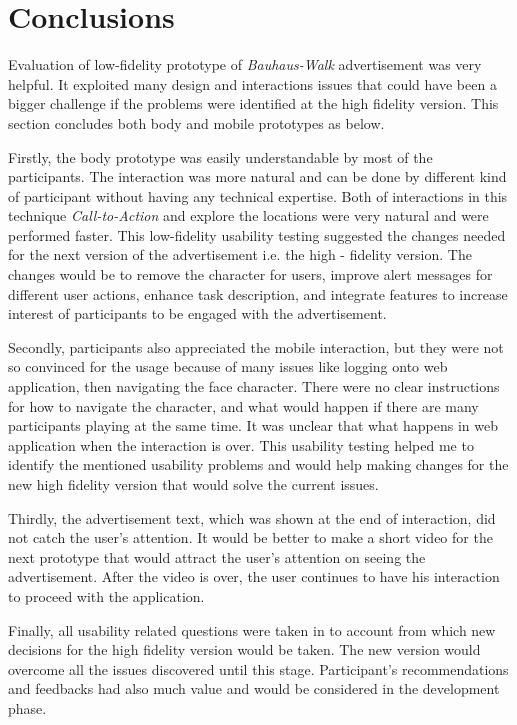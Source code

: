 \section{Conclusions}

Evaluation of low-fidelity prototype of \emph{Bauhaus-Walk} advertisement was very helpful. It exploited many design and interactions issues that could have been a bigger challenge if the problems were identified at the high fidelity version. This section concludes both body and mobile prototypes as below.

Firstly, the body prototype was easily understandable by most of the participants. The interaction was more natural and can be done by different kind of participant without having any technical expertise. Both of interactions in this technique \emph{Call-to-Action} and explore the locations were very natural and were performed faster. This low-fidelity usability testing suggested the changes needed for the next version of the advertisement i.e. the high - fidelity version. The changes would be to remove the character for users, improve alert messages for different user actions, enhance task description, and integrate features to increase interest of participants to be engaged with the advertisement.

Secondly, participants also appreciated the mobile interaction, but they were not so convinced for the usage because of many issues like logging onto web application, then navigating the face character. There were no clear instructions for how to navigate the character, and what would happen if there are many participants playing at the same time. It was unclear that what happens in web application when the interaction is over. This usability testing helped me to identify the mentioned usability problems and would help making changes for the new high fidelity version that would solve the current issues.

Thirdly, the advertisement text, which was shown at the end of interaction, did not catch the user's attention. It would be better to make a short video for the next prototype that would attract the user's attention on seeing the advertisement. After the video is over, the user continues to have his interaction to proceed with the application.

Finally, all usability related questions were taken in to account from which new decisions for the high fidelity version would be taken. The new version would overcome all the issues discovered until this stage. Participant’s recommendations and feedbacks had also much value and would be considered in the development phase.

